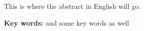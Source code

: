 This is where the abstract in English will go.

\medskip
{\bf Key words:} and some key words as well

